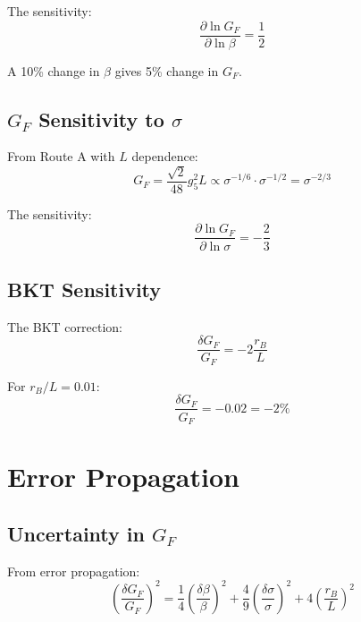 \documentclass[11pt,a4paper]{article}
\begin{document}
The sensitivity:
\begin{equation}
\label{eq:gf-beta-sens}
\frac{\partial \ln G_F}{\partial \ln \beta} = \frac{1}{2}
\end{equation}

A 10\% change in $\beta$ gives 5\% change in $G_F$.

\subsection{$G_F$ Sensitivity to $\sigma$}
\label{app:gf-sigma-sens}

From Route A with $L$ dependence:
\begin{equation}
\label{eq:gf-sigma-form}
G_F = \frac{\sqrt{2}}{48} g_5^2 L \propto \sigma^{-1/6} \cdot \sigma^{-1/2} = \sigma^{-2/3}
\end{equation}

The sensitivity:
\begin{equation}
\label{eq:gf-sigma-sens}
\frac{\partial \ln G_F}{\partial \ln \sigma} = -\frac{2}{3}
\end{equation}

\subsection{BKT Sensitivity}
\label{app:bkt-sens-detail}

The BKT correction:
\begin{equation}
\label{eq:bkt-sens}
\frac{\delta G_F}{G_F} = -2\frac{r_B}{L}
\end{equation}

For $r_B/L = 0.01$:
\begin{equation}
\label{eq:bkt-sens-num}
\frac{\delta G_F}{G_F} = -0.02 = -2\%
\end{equation}

\section{Error Propagation}
\label{app:error}

\subsection{Uncertainty in $G_F$}
\label{app:gf-error}

From error propagation:
\begin{equation}
\label{eq:gf-error}
\left(\frac{\delta G_F}{G_F}\right)^2 = \frac{1}{4}\left(\frac{\delta\beta}{\beta}\right)^2 + \frac{4}{9}\left(\frac{\delta\sigma}{\sigma}\right)^2 + 4\left(\frac{r_B}{L}\right)^2
\end{equation}
\end{document}
